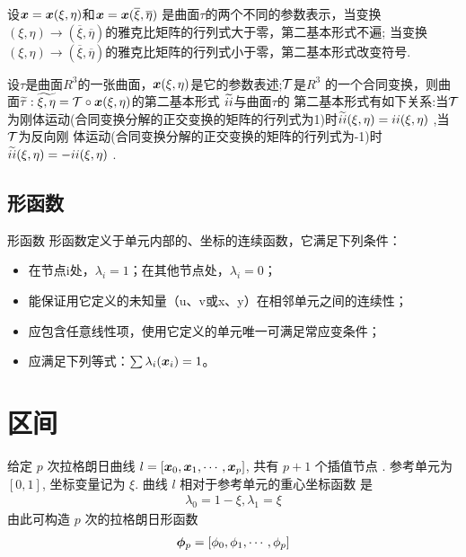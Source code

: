 \documentclass{article}
\begin{document}
\begin{property}
设${\boldsymbol x} = {\boldsymbol x}(\xi,\eta)$和${\boldsymbol x} = {\boldsymbol x}(\overline{\xi},
\overline{\eta})$ 是曲面$\tau$的两个不同的参数表示，当变换
$(\xi,\eta) \rightarrow (\overline{\xi},
\overline{\eta})$的雅克比矩阵的行列式大于零，第二基本形式不遍;
当变换
$(\xi,\eta) \rightarrow (\overline{\xi},
\overline{\eta})$的雅克比矩阵的行列式小于零，第二基本形式改变符号.
\end{property}

\begin{property}
设$\tau$是曲面$R^3$的一张曲面，${\boldsymbol x}(\xi,\eta)$是它的参数表述;${\mathcal T}$是$R^3$
的一个合同变换，则曲面$\widetilde{\tau}:\widetilde{\xi,\eta} = 
{\mathcal T} \circ {\boldsymbol x}(\xi,\eta)$的第二基本形式
$\widetilde{\uppercase\expandafter{\romannumeral2}}$与曲面$\tau$的
第二基本形式有如下关系:当${\mathcal T}$为刚体运动(合同变换分解的正交变换的矩阵的行列式为1)时$\widetilde{\uppercase\expandafter{\romannumeral2}}(\xi,\eta) = 
\uppercase\expandafter{\romannumeral2}(\xi,\eta)$ ,当${\mathcal T}$为反向刚
体运动(合同变换分解的正交变换的矩阵的行列式为-1)时$\widetilde{\uppercase\expandafter{\romannumeral2}}(\xi,\eta) = 
-\uppercase\expandafter{\romannumeral2}(\xi,\eta)$ .
\end{property}

\subsection{形函数}
\begin{definition}{形函数}
形函数定义于单元内部的、坐标的连续函数，它满足下列条件：
\begin{itemize}
\item 在节点i处，$\lambda_i =1$；在其他节点处，$\lambda_i = 0$；
\item 能保证用它定义的未知量（u、v或x、y）在相邻单元之间的连续性；
\item 应包含任意线性项，使用它定义的单元唯一可满足常应变条件；
\item 应满足下列等式：$\sum \lambda_i({\boldsymbol x}_i)= 1$。
\end{itemize}
\end{definition}

\section{区间}

给定 $p$ 次拉格朗日曲线 $l = [{\boldsymbol x}_0, {\boldsymbol x}_1, \cdots, {\boldsymbol x}_p]$, 共有 $p+1$ 个插值节点
. 参考单元为 $[0, 1]$, 坐标变量记为 $\xi$. 曲线 $l$ 相对于参考单元的重心坐标函数
是
\begin{align*}
    \lambda_0 = 1-\xi, \lambda_1 = \xi
\end{align*}
由此可构造 $p$ 次的拉格朗日形函数 
\begin{align*}
    {\bm \phi}_p = [\phi_0, \phi_1, \cdots, \phi_p]
\end{align*}
\end{document}
